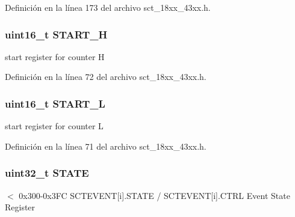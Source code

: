 Definición en la línea 173 del archivo sct\+\_\+18xx\+\_\+43xx.\+h.

\subsubsection[{\texorpdfstring{S\+T\+A\+R\+T\+\_\+H}{START_H}}]{ uint16\+\_\+t S\+T\+A\+R\+T\+\_\+H}\hypertarget{struct_l_p_c___s_c_t___t_add18e726d85892e9c64caa17aa3f6480}{}\label{struct_l_p_c___s_c_t___t_add18e726d85892e9c64caa17aa3f6480}
start register for counter H 

Definición en la línea 72 del archivo sct\+\_\+18xx\+\_\+43xx.\+h.

\subsubsection[{\texorpdfstring{S\+T\+A\+R\+T\+\_\+L}{START_L}}]{ uint16\+\_\+t S\+T\+A\+R\+T\+\_\+L}\hypertarget{struct_l_p_c___s_c_t___t_a6d4aac47c74876e11e3e593ff116ba7a}{}\label{struct_l_p_c___s_c_t___t_a6d4aac47c74876e11e3e593ff116ba7a}
start register for counter L 

Definición en la línea 71 del archivo sct\+\_\+18xx\+\_\+43xx.\+h.

\subsubsection[{\texorpdfstring{S\+T\+A\+TE}{STATE}}]{\setlength{\rightskip}{0pt plus 5cm}uint32\+\_\+t S\+T\+A\+TE}\hypertarget{struct_l_p_c___s_c_t___t_a7e62b5ac1947a8e2611996e0846f8c01}{}\label{struct_l_p_c___s_c_t___t_a7e62b5ac1947a8e2611996e0846f8c01}
$<$ 0x300-\/0x3\+FC S\+C\+T\+E\+V\+E\+NT\mbox{[}i\mbox{]}.S\+T\+A\+TE / S\+C\+T\+E\+V\+E\+NT\mbox{[}i\mbox{]}.C\+T\+RL Event State Register 

